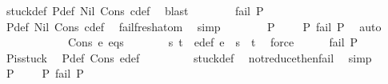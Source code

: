 \begin{isabellebody}
\ stuck{\isacharunderscore}{\kern0pt}def\ P{\isacharunderscore}{\kern0pt}def\ Nil\ Cons\ c{\isacharunderscore}{\kern0pt}def\ \isamarkupfalse%
\ blast\isanewline
\ \ \ \ \ \ \isamarkupfalse%
\ {\isachardoublequoteopen}fail\ P{\isachardoublequoteclose}\ \isanewline
\ \ \ \ \ \ \ \ \isamarkupfalse%
\ P{\isacharunderscore}{\kern0pt}def\ Nil\ Cons\ c{\isacharunderscore}{\kern0pt}def\ \isamarkupfalse%
\ fail{\isacharunderscore}{\kern0pt}fresh{\isacharunderscore}{\kern0pt}atom\ \isamarkupfalse%
\ simp\isanewline
\ \ \ \ \ \ \isamarkupfalse%
\ {\isachardoublequoteopen}P\ {\isasymin}\ {\isacharbraceleft}{\kern0pt}{\isacharparenleft}{\kern0pt}{\isacharbrackleft}{\kern0pt}{\isacharbrackright}{\kern0pt}{\isacharcomma}{\kern0pt}\ {\isacharbrackleft}{\kern0pt}{\isacharbrackright}{\kern0pt}{\isacharparenright}{\kern0pt}{\isacharbraceright}{\kern0pt}\ {\isasymunion}\ {\isacharbraceleft}{\kern0pt}P{}{\isachardot}{\kern0pt}\ fail\ P{}{\isacharbraceright}{\kern0pt}{\isachardoublequoteclose}\ \isamarkupfalse%
\ auto\isanewline
\ \ \ \ \isamarkupfalse%
\isanewline
\ \ \isamarkupfalse%
\isanewline
\ \ \ \ \isamarkupfalse%
{\isacharparenleft}{\kern0pt}Cons\ e\ eqs{\isacharprime}{\kern0pt}{\isacharparenright}{\kern0pt}\isanewline
\ \ \ \ \isamarkupfalse%
\ \isamarkupfalse%
\ s\ t\ \ e{\isacharunderscore}{\kern0pt}def{\isacharcolon}{\kern0pt}\ {\isachardoublequoteopen}e\ {\isacharequal}{\kern0pt}\ s\ {\isasymapprox}{\isacharquery}{\kern0pt}\ t{\isachardoublequoteclose}\ \isamarkupfalse%
\ force\isanewline
\ \ \ \ \isamarkupfalse%
\ {\isachardoublequoteopen}fail\ P{\isachardoublequoteclose}\ \isanewline
\ \ \ \ \ \ \isamarkupfalse%
\ P{\isacharunderscore}{\kern0pt}is{\isacharunderscore}{\kern0pt}stuck\ \isamarkupfalse%
\ P{\isacharunderscore}{\kern0pt}def\ Cons\ e{\isacharunderscore}{\kern0pt}def\ \isanewline
\ \ \ \ \ \ \ \ stuck{\isacharunderscore}{\kern0pt}def\ \isamarkupfalse%
\ not{\isacharunderscore}{\kern0pt}reduce{\isacharunderscore}{\kern0pt}then{\isacharunderscore}{\kern0pt}fail\ \isamarkupfalse%
\ simp\isanewline
\ \ \ \ \isamarkupfalse%
\ {\isachardoublequoteopen}P\ {\isasymin}\ {\isacharbraceleft}{\kern0pt}{\isacharparenleft}{\kern0pt}{\isacharbrackleft}{\kern0pt}{\isacharbrackright}{\kern0pt}{\isacharcomma}{\kern0pt}\ {\isacharbrackleft}{\kern0pt}{\isacharbrackright}{\kern0pt}{\isacharparenright}{\kern0pt}{\isacharbraceright}{\kern0pt}\ {\isasymunion}\ {\isacharbraceleft}{\kern0pt}P{}{\isachardot}{\kern0pt}\ fail\ P{}{\isacharbraceright}{\kern0pt}{\isachardoublequoteclose}\ \isamarkupfalse%

\end{isabellebody}
